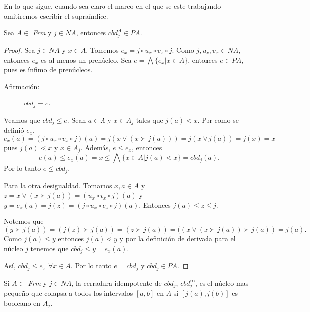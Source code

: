 En lo que sigue, cuando sea claro el marco en el que se este trabajando omitiremos escribir el supraíndice.

\begin{thm}
Sea $A\in$ \textit{Frm} y $j\in NA$, entonces $cbd_j^{A}\in PA$.
\end{thm}

\begin{proof}
Sea $j\in NA$ y $x\in A$. Tomemos $e_x=j\circ u_x\circ v_x\circ j$. Como $j, u_x, v_x\in NA$, entonces $e_x$ es al menos un prenúcleo. Sea $e=\bigwedge\{e_x|x\in A\}$, entonces $e\in PA$, pues es ínfimo de prenúcleos.
\begin{description}
\item[Afirmación:] $cbd_j=e$. 
\end{description}

Veamos que $cbd_j\leq e$. Sean $a\in A$ y $x\in A_j$ tales que $j(a)\lessdot x$. Por como se definió $e_x$, $e_x(a)=(j\circ u_x\circ v_x\circ j)(a)=j(x\vee (x\succ j(a)))=j(x\vee j(a))=j(x)=x$ pues $j(a)\lessdot x$ y $x\in A_j$. Además, $e\leq e_x$, entonces 
$$e(a)\leq e_x(a)=x\leq \bigwedge\{x\in A|j(a)\lessdot x\}=cbd_j(a).$$
Por lo tanto $e\leq cbd_j$.

Para la otra desigualdad. Tomamos $x,a\in A$ y $z=x\vee (x\succ j(a))=(u_x \circ v_x\circ j)(a)$ y $y=e_x(a)=j(z)=(j\circ u_x \circ v_x\circ j)(a)$. Entonces $j(a)\leq z\leq j$.

\noindent
Notemos que $$(y\succ j(a))=(j(z)\succ j(a))=(z\succ j(a))=((x\vee (x\succ j(a))\succ j(a))=j(a).$$ 
Como $j(a)\leq y$ entonces $j(a)\lessdot y$ y por la definición de derivada para el núcleo $j$ tenemos que $cbd_j\leq y=e_x(a)$.

\noindent
Así, $cbd_j\leq e_x$ $\forall x\in A$. Por lo tanto $e=cbd_j$ y $cbd_j\in PA$. 
\end{proof}

\begin{lemma}
Si $A\in$ \textit{Frm} y $j\in NA$, la cerradura idempotente de $cbd_j$, $cbd_j^{\infty}$, es el núcleo mas pequeño que colapsa a todos los intervalos $[a, b]$ en $A$ si $[j(a),j(b)]$ es booleano en $A_j$.
\end{lemma}

